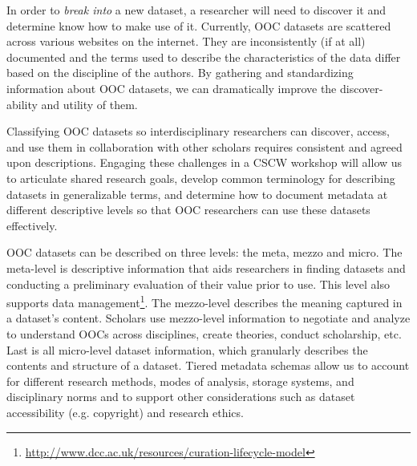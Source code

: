 In order to \emph{break into} a new dataset, a researcher will need to discover it and determine know how to make use of it.  Currently, OOC datasets are scattered across various websites on the internet.  They are inconsistently (if at all) documented and the terms used to describe the characteristics of the data differ based on the discipline of the authors.  By gathering and standardizing information about OOC datasets, we can dramatically improve the discover-ability and utility of them.

Classifying OOC datasets so interdisciplinary researchers can discover, access, and use them in collaboration with other scholars requires consistent and agreed upon descriptions. Engaging these challenges in a CSCW workshop will allow us to articulate shared research goals, develop common terminology for describing datasets in generalizable terms, and determine how to document metadata at different descriptive levels so that OOC researchers can use these datasets effectively. 

OOC datasets can be described on three levels: the meta, mezzo and micro.  The meta-level is descriptive information that aids researchers in finding datasets and conducting a preliminary evaluation of their value prior to use.  This level also supports data management\footnote{\url{http://www.dcc.ac.uk/resources/curation-lifecycle-model}}.  The mezzo-level describes the meaning captured in a dataset's content.  Scholars use mezzo-level information to negotiate and analyze to understand OOCs across disciplines, create theories, conduct scholarship, etc.  Last is all micro-level dataset information, which granularly describes the contents and structure of a dataset. Tiered metadata schemas allow us to account for different research methods, modes of analysis, storage systems, and disciplinary norms and to support other considerations such as dataset accessibility (e.g. copyright) and research ethics.
